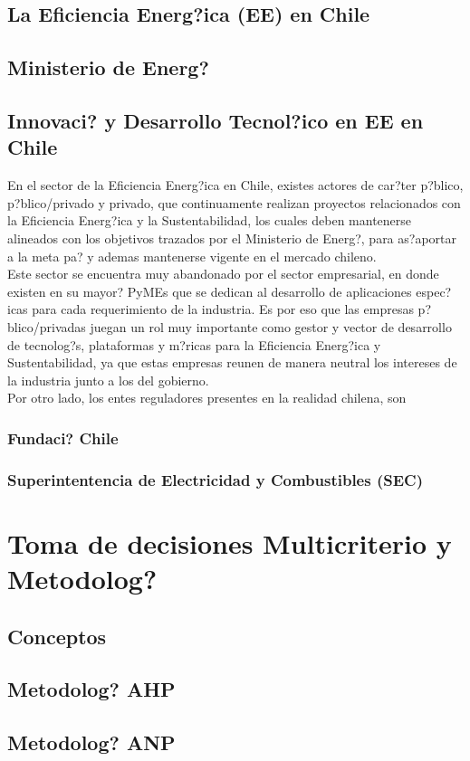 \subsection{La Eficiencia Energ?ica (EE) en Chile}

\subsection{Ministerio de Energ?}

\subsection{Innovaci? y Desarrollo Tecnol?ico en EE en Chile}
En el sector de la Eficiencia Energ?ica en Chile, existes actores de car?ter p?blico, p?blico/privado y privado, que continuamente realizan proyectos relacionados con la Eficiencia Energ?ica y la Sustentabilidad, los cuales deben mantenerse alineados con los objetivos trazados por el Ministerio de Energ?, para as?aportar a la meta pa? y ademas mantenerse vigente en el mercado chileno.\\

Este sector se encuentra muy abandonado por el sector empresarial,   en donde existen en su mayor? PyMEs que se dedican al desarrollo de aplicaciones espec?icas para cada requerimiento de la industria. Es por eso que las empresas p?blico/privadas juegan un rol muy importante como gestor y vector de desarrollo de tecnolog?s, plataformas y m?ricas para la Eficiencia Energ?ica y Sustentabilidad, ya que estas empresas reunen de manera neutral los intereses de la industria junto a los del gobierno.\\

Por otro lado, los entes reguladores presentes en la realidad chilena, son

\subsubsection{Fundaci? Chile}

\subsubsection{Superintentencia de Electricidad y Combustibles (SEC)}


\section{Toma de decisiones Multicriterio y Metodolog?}

\subsection{Conceptos}

\subsection{Metodolog? AHP}

\subsection{Metodolog? ANP}